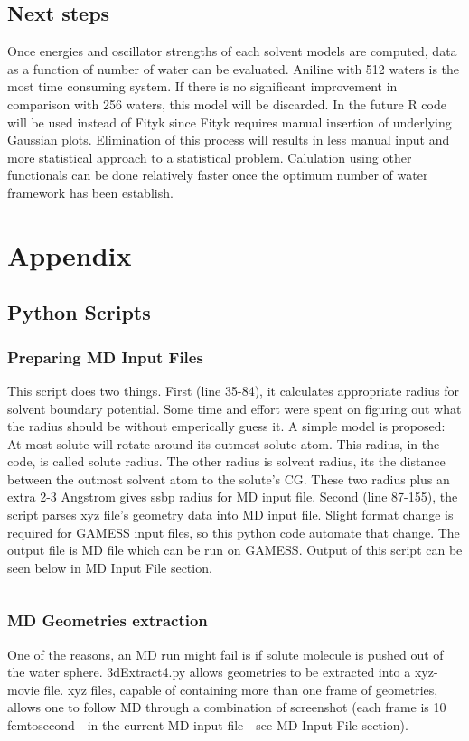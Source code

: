\documentclass[
journal=jpcbfk, %
manuscript=article]{achemso}
\begin{document}
\subsection{Next steps}
Once energies and oscillator strengths of each solvent models are computed, data as a function of number of water can be evaluated. Aniline with 512 waters is the most time consuming system. If there is no significant improvement in comparison with 256 waters, this model will be discarded. 
In the future R code will be used instead of Fityk since Fityk requires manual insertion of underlying Gaussian plots. Elimination of this process will results in less manual input and more statistical approach to a statistical problem. Calulation using other functionals can be done relatively faster once the optimum number of water framework has been establish.

\clearpage
\appendix 
\label{appendix}
\section*{Appendix}
\renewcommand{\thesubsection}{\Alph{sub}}
	\subsection{Python Scripts}
		\subsubsection{Preparing MD Input Files}
			This script does two things. First (line 35-84), it calculates appropriate radius for solvent boundary potential. Some time and effort were spent on figuring out what the radius should be without emperically guess it. A simple model is proposed: At most solute will rotate around its outmost solute atom. This radius, in the code, is called solute radius. The other radius is solvent radius, its the distance between the outmost solvent atom to the solute's CG. These two radius plus an extra 2-3 Angstrom gives ssbp radius for MD input file. Second (line 87-155), the script parses xyz file's geometry data into MD input file. Slight format change is required for GAMESS input files, so this python code automate that change. The output file is MD file which can be run on GAMESS. Output of this script can be seen below in MD Input File section.
			\vfill
			\inputminted[linenos, breaklines, baselinestretch=1, fontsize=\small]{python}{../pythonScripts/prepareMD2.py}
		
		\subsubsection{MD Geometries extraction}
			One of the reasons, an MD run might fail is if solute molecule is pushed out of the water sphere. 3dExtract4.py allows geometries to be extracted into a xyz-movie file. xyz files, capable of containing more than one frame of geometries, allows one to follow MD through a combination of screenshot (each frame is 10 femtosecond - in the current MD input file - see MD Input File section). 
			\inputminted[linenos, breaklines, baselinestretch=1, fontsize=\small]{python}{../pythonScripts/3dExtract4.py}
			
\end{document}
